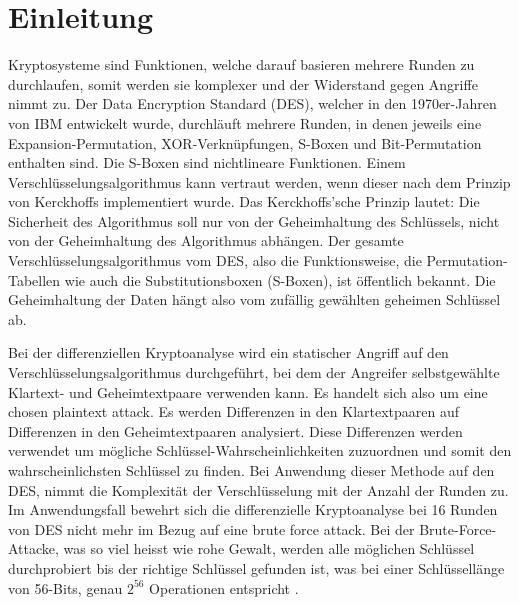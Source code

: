 \clearpage
\section{Einleitung}\label{sec:Einleitung}

Kryptosysteme sind Funktionen, welche darauf basieren mehrere Runden zu durchlaufen, somit werden sie komplexer und der Widerstand gegen Angriffe nimmt zu. 
Der Data Encryption Standard (DES), welcher in den 1970er-Jahren von IBM entwickelt wurde, durchläuft mehrere Runden, in denen jeweils eine Expansion-Permutation,  XOR-Verknüpfungen, S-Boxen und Bit-Permutation enthalten sind. Die S-Boxen sind nichtlineare Funktionen. 
Einem Verschlüsselungsalgorithmus kann vertraut werden, wenn dieser nach dem Prinzip von Kerckhoffs implementiert wurde. 
Das Kerckhoffs'sche Prinzip lautet: Die Sicherheit des Algorithmus soll nur von der Geheimhaltung des Schlüssels, nicht von der Geheimhaltung des Algorithmus abhängen. 
Der gesamte Verschlüsselungsalgorithmus vom DES, also die Funktionsweise, die Permutation-Tabellen wie auch die Substitutionsboxen (S-Boxen), ist öffentlich bekannt. Die Geheimhaltung der Daten hängt also vom zufällig gewählten geheimen Schlüssel ab. 

Bei der differenziellen Kryptoanalyse wird ein statischer Angriff auf den Verschlüsselungsalgorithmus durchgeführt, bei dem der Angreifer selbstgewählte Klartext- und Geheimtextpaare verwenden kann. Es handelt sich also um eine \glqq chosen plaintext attack\grqq .  
Es werden Differenzen in den Klartextpaaren auf Differenzen in den Geheimtextpaaren analysiert. Diese Differenzen werden verwendet um mögliche Schlüssel-Wahrscheinlichkeiten zuzuordnen und somit den wahrscheinlichsten Schlüssel zu finden. 
Bei Anwendung dieser Methode auf den DES, nimmt die Komplexität der Verschlüsselung mit der Anzahl der Runden zu. Im Anwendungsfall bewehrt sich die differenzielle Kryptoanalyse bei 16 Runden von DES nicht mehr im Bezug auf eine \glqq brute force attack\grqq . Bei der Brute-Force-Attacke, was so viel heisst wie rohe Gewalt, werden alle möglichen Schlüssel durchprobiert bis der richtige Schlüssel gefunden ist, was bei einer Schlüssellänge von 56-Bits, genau $2^{56}$ Operationen entspricht \cite{biham_differential_1990}. 
 
 



